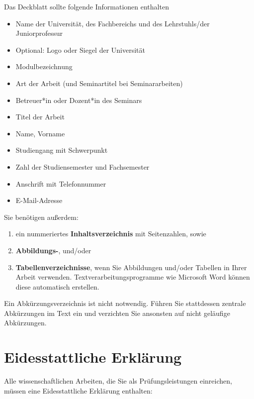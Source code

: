 \documentclass[
  letterpaper,
  DIV=11]{scrreprt}
\providecommand{\tightlist}{%
  \setlength{\itemsep}{0pt}\setlength{\parskip}{0pt}}\usepackage{longtable,booktabs,array}
\begin{document}
Das Deckblatt sollte folgende Informationen enthalten

\begin{itemize}
\item
  Name der Universität, des Fachbereichs und des Lehrstuhls/der
  Juniorprofessur
\item
  Optional: Logo oder Siegel der Universität
\item
  Modulbezeichnung
\item
  Art der Arbeit (und Seminartitel bei Seminararbeiten)
\item
  Betreuer*in oder Dozent*in des Seminars
\item
  Titel der Arbeit
\item
  Name, Vorname
\item
  Studiengang mit Schwerpunkt
\item
  Zahl der Studiensemester und Fachsemester
\item
  Anschrift mit Telefonnummer
\item
  E-Mail-Adresse
\end{itemize}

Sie benötigen außerdem:

\begin{enumerate}
\def\labelenumi{\arabic{enumi}.}
\tightlist
\item
  ein nummeriertes \textbf{Inhaltsverzeichnis} mit Seitenzahlen, sowie
\item
  \textbf{Abbildungs-}, und/oder
\item
  \textbf{Tabellenverzeichnisse}, wenn Sie Abbildungen und/oder Tabellen
  in Ihrer Arbeit verwenden. Textverarbeitungsprogramme wie Microsoft
  Word können diese automatisch erstellen.
\end{enumerate}

Ein Abkürzungsverzeichnis ist nicht notwendig. Führen Sie stattdessen
zentrale Abkürzungen im Text ein und verzichten Sie ansonsten auf nicht
geläufige Abkürzungen.

\hypertarget{eidesstattliche-erkluxe4rung}{%
\section{Eidesstattliche Erklärung}\label{eidesstattliche-erkluxe4rung}}

Alle wissenschaftlichen Arbeiten, die Sie als Prüfungsleistungen
einreichen, müssen eine Eidesstattliche Erklärung enthalten:
\end{document}
